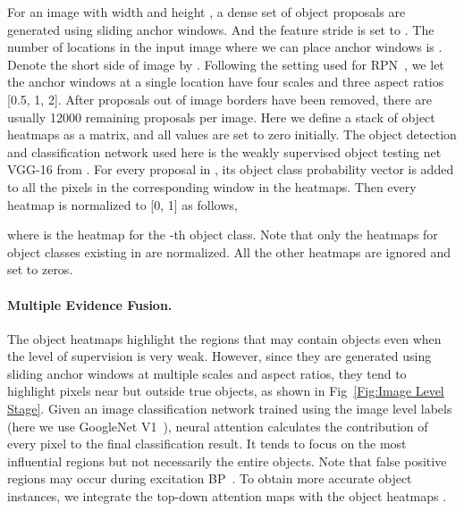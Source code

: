 \documentclass[10pt,twocolumn,letterpaper]{article}
\begin{document}
For an image  with width  and height , a dense set of object proposals  are generated using sliding anchor windows. And the feature stride  is set to . The number of locations in the input image where we can place anchor windows is . Denote the short side of image  by . Following the setting used for RPN~\cite{ren2015faster}, we let the anchor windows at a single location have four scales  and three aspect ratios [0.5, 1, 2]. After proposals out of image borders have been removed, there are usually 12000 remaining proposals per image. Here we define a stack of object heatmaps  as a  matrix, and all values are set to zero initially. The object detection and classification network  used here is the weakly supervised object testing net VGG-16 from \cite{tang2017multiple}. For every proposal  in , its object class probability vector  is added to all the pixels in the corresponding window in the heatmaps. Then every heatmap is normalized to [0, 1] as follows,
    
where  is the heatmap for the -th object class. Note that only the heatmaps for object classes existing in  are normalized. All the other heatmaps are ignored and set to zeros.
\vspace{-5mm}
\paragraph{Multiple Evidence Fusion.} The object heatmaps highlight the regions that may contain objects even when the level of supervision is very weak. However, since they are generated using sliding anchor windows at multiple scales and aspect ratios, they tend to highlight pixels near but outside true objects, as shown in Fig~\ref{Fig:Image Level Stage}. Given an image classification network trained using the image level labels (here we use GoogleNet V1~\cite{zhang2016top}), neural attention calculates the contribution of every pixel to the final classification result. It tends to focus on the most influential regions but not necessarily the entire objects. Note that false positive regions may occur during excitation BP~\cite{zhang2016top}. To obtain more accurate object instances, we integrate the top-down attention maps  with the object heatmaps .
\end{document}
